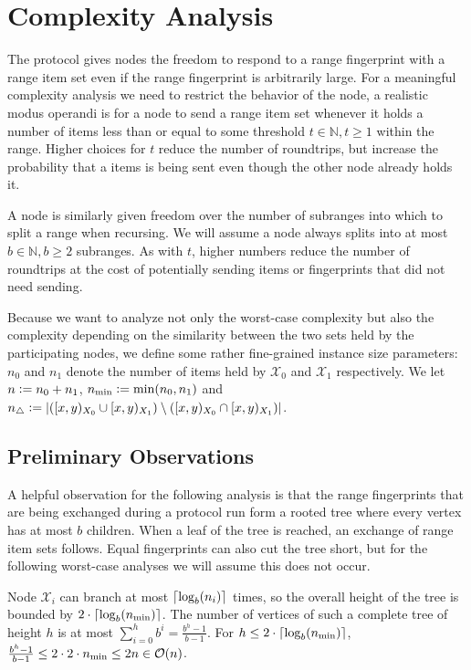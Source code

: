 \section{Complexity Analysis}
\label{set-reconciliation-complexity}

The protocol gives nodes the freedom to respond to a range fingerprint with a range item set even if the range fingerprint is arbitrarily large. For a meaningful complexity analysis we need to restrict the behavior of the node, a realistic modus operandi is for a node to send a range item set whenever it holds a number of items less than or equal to some threshold $t \in \mathbb{N}, t \geq 1$ within the range. Higher choices for $t$ reduce the number of roundtrips, but increase the probability that a items is being sent even though the other node already holds it.

A node is similarly given freedom over the number of subranges into which to split a range when recursing. We will assume a node always splits into at most $b \in \mathbb{N}, b \geq 2$ subranges. As with $t$, higher numbers reduce the number of roundtrips at the cost of potentially sending items or fingerprints that did not need sending.

Because we want to analyze not only the worst-case complexity but also the complexity depending on the similarity between the two sets held by the participating nodes, we define some rather fine-grained instance size parameters: $n_0$ and $n_1$ denote the number of items held by $\mathcal{X}_0$ and $\mathcal{X}_1$ respectively. We let $n \vcentcolon= n_0 + n_1$, $n_{\min} \vcentcolon= \min(n_0, n_1)$ and $n_{\triangle} \vcentcolon= |{([{x},{y})_{X_0} \cup [{x},{y})_{X_1}) \setminus ([{x},{y})_{X_0} \cap [{x},{y})_{X_1})}|$.

\subsection{Preliminary Observations}

A helpful observation for the following analysis is that the range fingerprints that are being exchanged during a protocol run form a rooted tree where every vertex has at most $b$ children. When a leaf of the tree is reached, an exchange of range item sets follows. Equal fingerprints can also cut the tree short, but for the following worst-case analyses we will assume this does not occur.

Node $\mathcal{X}_i$ can branch at most $\lceil\log_{b}(n_i)\rceil$ times, so the overall height of the tree is bounded by $2 \cdot\lceil\log_{b}(n_{\min})\rceil$. The number of vertices of such a complete tree of height $h$ is at most $\sum_{i=0}^{h} b^{i} = \frac{b^{h} - 1}{b - 1}$. For $h \leq 2 \cdot\lceil\log_{b}(n_{\min})\rceil$, $\frac{b^{h} - 1}{b - 1} \leq 2 \cdot 2 \cdot n_{\min} \leq 2n \in \mathcal{O}(n)$.

